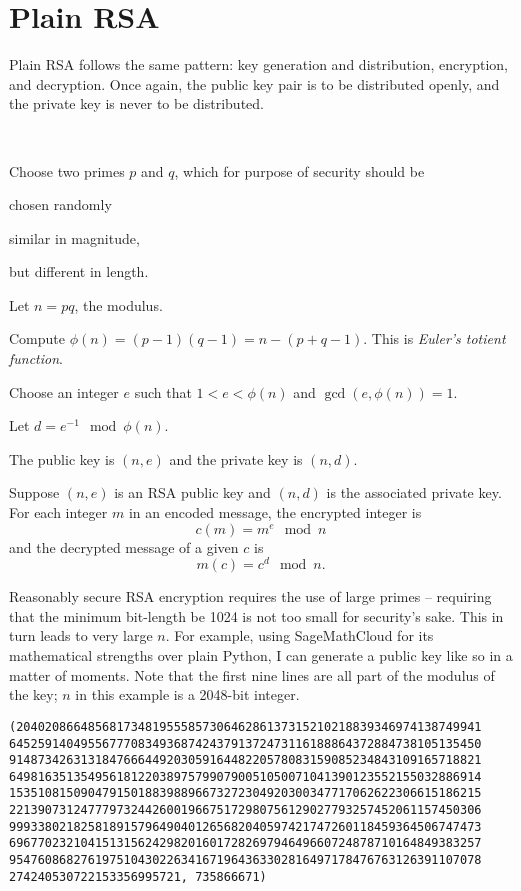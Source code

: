 \documentclass[m3380-lec-main.tex]{subfiles}
\begin{document}
\section{Plain RSA}
Plain RSA follows the same pattern: key generation and distribution, encryption, and decryption. Once again, the public key pair is to be distributed openly, and the private key is never to be distributed.


\begin{alg}~
\begin{enum}
\item Choose two primes $p$ and $q$, which for purpose of security should be
\begin{enuma}
\item chosen randomly
\item similar in magnitude,
\item but different in length.
\end{enuma}
\item Let $n=pq$, the modulus.
\item Compute $\phi(n) = (p-1)(q-1) = n-(p+q-1)$. This is \emph{Euler's totient function}.
\item Choose an integer $e$ such that $1<e<\phi(n)$ and $\gcd(e,\phi(n))=1$.
\item Let $d = e^{-1}\mod \phi(n)$.
\end{enum}
The public key is $(n,e)$ and the private key is $(n,d)$.
\end{alg}


\begin{alg}
Suppose $(n,e)$ is an RSA public key and $(n,d)$ is the associated private key.
For each integer $m$ in an encoded message, the encrypted integer is 
\[c(m) = m^e\mod n\] and the decrypted message of a given $c$ is \[m(c) = c^d\mod n.\]
\end{alg}

Reasonably secure RSA encryption requires the use of large primes -- requiring that the minimum bit-length be 1024 is not too small for security's sake. This in turn leads to very large $n$. For example, using SageMathCloud for its mathematical strengths over plain Python, I can generate a public key like so in a matter of moments. Note that the first nine lines are all part of the modulus of the key; $n$ in this example is a 2048-bit integer.


\bc
\begin{verbatim}
(20402086648568173481955585730646286137315210218839346974138749941
645259140495567770834936874243791372473116188864372884738105135450
914873426313184766644920305916448220578083159085234843109165718821
649816351354956181220389757990790051050071041390123552155032886914
153510815090479150188398896673272304920300347717062622306615186215
221390731247779732442600196675172980756129027793257452061157450306
999338021825818915796490401265682040597421747260118459364506747473
696770232104151315624298201601728269794649660724878710164849383257
954760868276197510430226341671964363302816497178476763126391107078
274240530722153356995721, 735866671)
\end{verbatim}
\ec
\end{document}
